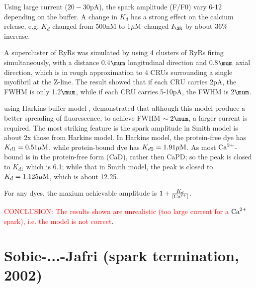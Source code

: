 Using large current ($20-30$pA), the spark amplitude (F/F0) vary 6-12
depending on the buffer. A change in $K_d$ has a strong effect on the calcium
release, e.g. $K_d$ changed from 500nM to 1${\mu\text{M}}$ changed $I_\SR$ by about 36\%
increase. 

A supercluster of RyRs was simulated by using 4 clusters of RyRs firing
simultaneously, with a distance 0.4$\mum$ longitudinal direction and 0.8$\mum$
axial direction, which is in rough approximation to 4 CRUs surrounding a single
myofibril at the Z-line. The result showed that if each CRU carries 2pA, the
FWHM is only 1.2$\mum$, while if each CRU carries 5-10pA, the FWHM is 2$\mum$.

\citep{izu2001lcg} using Harkins buffer model \citep{harkins1993}, demonstrated
that although this model produce a better spreading of fluorescence, to achieve
FWHM $\sim 2\mum$, a larger current is required. The most striking feature is
the spark amplitude in Smith model \citep{smith1998} is about 2x those from
Harkins model. In Harkins model, the protein-free dye has $K_{d1}=0.51{\mu\text{M}}$,
while protein-bound dye has $K_{d2}=1.91{\mu\text{M}}$. As most ${\text{Ca}^{2+}}$-bound is in the
protein-free form (CaD), rather then CaPD; so the peak is closed to $K_{d1}$
which is 6.1; while that in Smith model, the peak is closed to $K_d=1.125{\mu\text{M}}$,
which is about 12.25.

\begin{framed}
For any dyes, the maxium achievable amplitude is $1+\frac{K_d}{[{\text{Ca}^{2+}}]}$.
\end{framed}

\textcolor{red}{CONCLUSION: The results shown are unrealistic (too large
current for a ${\text{Ca}^{2+}}$ spark), i.e. the model is not correct}. 




\section{Sobie-...-Jafri (spark termination, 2002)}
\label{sec:sobie2002_jafri}


